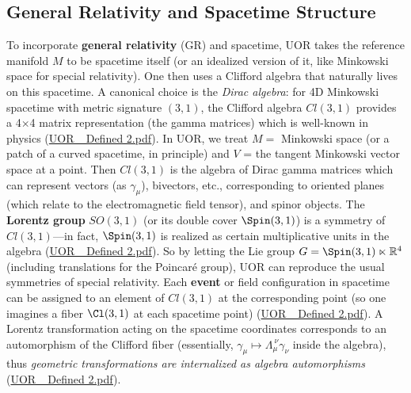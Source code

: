 \documentclass[12pt]{article}
\begin{document}
\subsection{General Relativity and Spacetime Structure}

To incorporate \textbf{general relativity} (GR) and spacetime, UOR takes the reference manifold $M$ to be spacetime itself (or an idealized version of it, like Minkowski space for special relativity). One then uses a Clifford algebra that naturally lives on this spacetime. A canonical choice is the \emph{Dirac algebra}: for 4D Minkowski spacetime with metric signature $(3,1)$, the Clifford algebra $Cl(3,1)$ provides a 4$\times$4 matrix representation (the gamma matrices) which is well-known in physics (\href{file://file-TBF3nHDaRR5QeVMmwCFYkp#:~:text=manifold%20with%20the%20Poincar%C3%A9%20or,A%20natural%20choice%20is%20the}{UOR\_ Defined 2.pdf}). In UOR, we treat $M =$ Minkowski space (or a patch of a curved spacetime, in principle) and $V$ = the tangent Minkowski vector space at a point. Then $Cl(3,1)$ is the algebra of Dirac gamma matrices which can represent vectors (as $\gamma_\mu$), bivectors, etc., corresponding to oriented planes (which relate to the electromagnetic field tensor), and spinor objects. The \textbf{Lorentz group} $SO(3,1)$ (or its double cover $\Spin(3,1)$) is a symmetry of $Cl(3,1)$---in fact, $\Spin(3,1)$ is realized as certain multiplicative units in the algebra (\href{file://file-TBF3nHDaRR5QeVMmwCFYkp#:~:text=Dirac%E2%80%93Clifford%20algebra%20%24Cl,and%20its}{UOR\_ Defined 2.pdf}). So by letting the Lie group $G = \Spin(3,1) \ltimes \mathbb{R}^4$ (including translations for the Poincaré group), UOR can reproduce the usual symmetries of special relativity. Each \textbf{event} or field configuration in spacetime can be assigned to an element of $Cl(3,1)$ at the corresponding point (so one imagines a fiber $\Cl(3,1)$ at each spacetime point) (\href{file://file-TBF3nHDaRR5QeVMmwCFYkp#:~:text=%28spinors%2C%20vectors%2C%20etc,This%20recovers%20familiar}{UOR\_ Defined 2.pdf}). A Lorentz transformation acting on the spacetime coordinates corresponds to an automorphism of the Clifford fiber (essentially, $\gamma_\mu \mapsto \Lambda_\mu^{~\nu} \gamma_\nu$ inside the algebra), thus \emph{geometric transformations are internalized as algebra automorphisms} (\href{file://file-TBF3nHDaRR5QeVMmwCFYkp#:~:text=algebra%20contains%20the%20Dirac%20gamma,can%20thus%20embed%20relativistic%20fields}{UOR\_ Defined 2.pdf}).

\medskip
\end{document}
